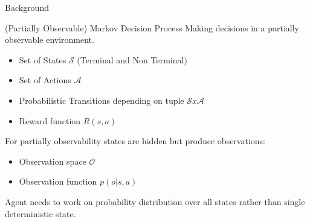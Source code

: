 \begin{exampleblock}{Background}
\begin{block}{(Partially Observable) Markov Decision Process}
Making decisions in a partially observable environment.

\begin{itemize}
    \item Set of States $\mathcal{S}$ (Terminal and Non Terminal)
    \item Set of Actions $\mathcal{A}$
    \item Probabilistic Transitions depending on tuple $\mathcal{S} x \mathcal{A}$
    \item Reward function $R(s,a)$
\end{itemize}

For partially observability states are hidden but produce observations:
\begin{itemize}
    \item Observation space $\mathcal{O}$
    \item Observation function $p(o | s, a)$
\end{itemize}

Agent needs to work on probability distribution over all states rather than single deterministic state.
\end{block}

\end{exampleblock}
